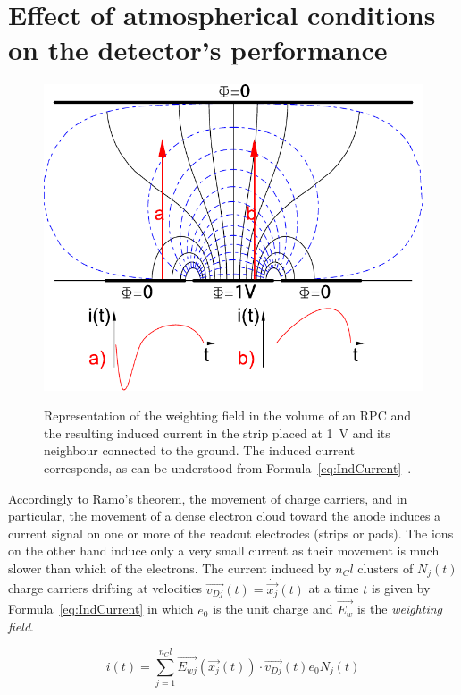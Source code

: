 \section{Effect of atmospherical conditions on the detector's performance}
\label{chapt4:sec:PTcorrection}
	
	\begin{figure}[H]
		\centering
		\includegraphics[width = 0.7\plotwidth]{fig/chapt4/Weighting_field.pdf}\\
		\caption{\label{fig:weighting-field} Representation of the weighting field in the volume of an RPC and the resulting induced current in the strip placed at \SI{1}{V} and its neighbour connected to the ground. The induced current corresponds, as can be understood from Formula~\ref{eq:IndCurrent}~\cite{LIPPMANN2003}.}
	\end{figure}

	Accordingly to Ramo's theorem, the movement of charge carriers, and in particular, the movement of a dense electron cloud toward the anode induces a current signal on one or more of the readout electrodes (strips or pads). The ions on the other hand induce only a very small current as their movement is much slower than which of the electrons. The current induced by $n_Cl$ clusters of $N_j(t)$ charge carriers drifting at velocities $\overrightarrow{v_{Dj}}(t) = \dot{\overrightarrow{x_j}}(t)$ at a time $t$ is given by Formula~\ref{eq:IndCurrent} in which $e_0$ is the unit charge and $\overrightarrow{E_w}$ is the \textit{weighting field}.
	
	\begin{equation}
	\label{eq:IndCurrent}
	i(t) = \sum_{j=1}^{n_Cl} \overrightarrow{E_{wj}}(\overrightarrow{x_j}(t)) \cdot \overrightarrow{v_{Dj}}(t) e_0 N_j(t)
	\end{equation}
	
